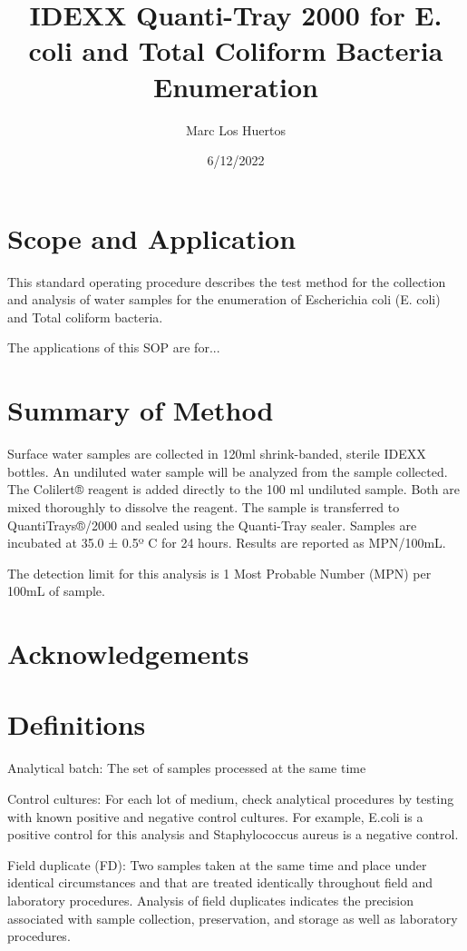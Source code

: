 \documentclass[12pt]{../SOP4_alpha}\usepackage[]{graphicx}\usepackage[]{xcolor}
\title{IDEXX Quanti-Tray 2000 for E. coli and Total Coliform Bacteria Enumeration}
\date{6/12/2022}
\author{Marc Los Huertos}
\begin{document}
\maketitle

\section{Scope and Application}

\NP This standard operating procedure describes the test method for the collection 
and analysis of water samples for the enumeration of Escherichia coli (E. coli) 
and Total coliform bacteria.

\NP The applications of this SOP are for...

\section{Summary of Method}

\NP Surface water samples are collected in 120ml shrink-banded, sterile IDEXX 
bottles. An undiluted water sample will be analyzed from the sample collected.
The Colilert® reagent is added directly to the 100 ml undiluted sample. Both 
are mixed thoroughly to dissolve the reagent. The sample is transferred to 
QuantiTrays®/2000 and sealed using the Quanti-Tray sealer. Samples are incubated 
at 35.0 ± 0.5º C for 24 hours. Results are reported as MPN/100mL. 

\NP The detection limit for this analysis is 1 Most Probable Number (MPN) per 100mL of sample. 

\tableofcontents

\newpage

\section{Acknowledgements}

\section{Definitions}

\NP Analytical batch: The set of samples processed at the same time

\NP Control cultures: For each lot of medium, check analytical procedures by
testing with known positive and negative control cultures. For example,
E.coli is a positive control for this analysis and Staphylococcus aureus is a
negative control.

\NP Field duplicate (FD): Two samples taken at the same time and place under
identical circumstances and that are treated identically throughout field
and laboratory procedures. Analysis of field duplicates indicates the
precision associated with sample collection, preservation, and storage as
well as laboratory procedures.
\end{document}

